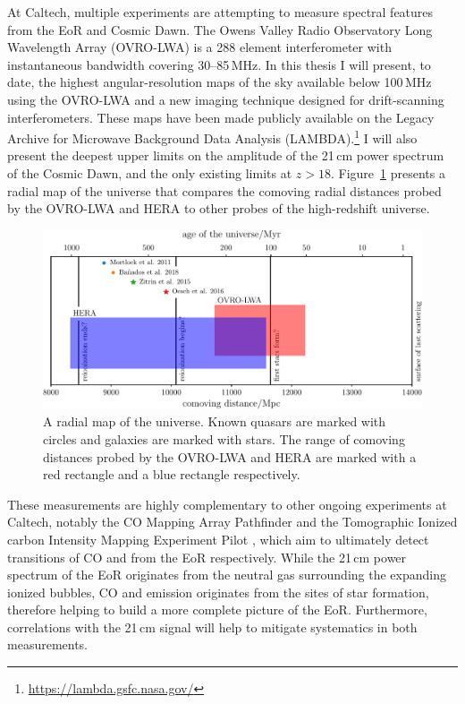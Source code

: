 \begin{bibunit}
At Caltech, multiple experiments are attempting to measure spectral features from the EoR and Cosmic
Dawn. The Owens Valley Radio Observatory Long Wavelength Array (OVRO-LWA) is a 288 element
interferometer with instantaneous bandwidth covering 30--85\,MHz. In this thesis I will present, to
date, the highest angular-resolution maps of the sky available below 100\,MHz using the OVRO-LWA and
a new imaging technique designed for drift-scanning interferometers. These maps have been made
publicly available on the Legacy Archive for Microwave Background Data Analysis (LAMBDA).\footnote{
    \url{https://lambda.gsfc.nasa.gov/}
}
I will also present the deepest upper limits on the amplitude of the 21\,cm power spectrum of the
Cosmic Dawn, and the only existing limits at $z > 18$. Figure~\ref{fig:history-of-the-universe}
presents a radial map of the universe that compares the comoving radial distances probed by the
OVRO-LWA and HERA to other probes of the high-redshift universe.

\begin{figure}[t]
    \centering
    \includegraphics[width=\textwidth]{figures/chapter1/history-of-the-universe/history-of-the-universe}
    \caption{
        A radial map of the universe. Known quasars are marked with circles and galaxies are marked
        with stars. The range of comoving distances probed by the OVRO-LWA and HERA are marked with
        a red rectangle and a blue rectangle respectively.
    }
    \label{fig:history-of-the-universe}
\end{figure}

These measurements are highly complementary to other ongoing experiments at Caltech, notably the CO
Mapping Array Pathfinder \citep[COMAP;][]{2016AAS...22742606C} and the Tomographic Ionized carbon
Intensity Mapping Experiment Pilot \citep[TIME-Pilot;][]{2017AAS...22912501C}, which aim to
ultimately detect transitions of CO and  from the EoR respectively. While the 21\,cm power
spectrum of the EoR originates from the neutral gas surrounding the expanding ionized bubbles, CO
and  emission originates from the sites of star formation, therefore helping to build a
more complete picture of the EoR.  Furthermore, correlations with the 21\,cm signal will help to
mitigate systematics in both measurements.


\end{bibunit}
